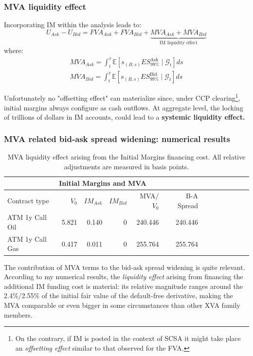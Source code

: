 \documentclass{beamer}
\begin{document}
\begin{frame}
\frametitle{MVA liquidity effect}
\footnotesize{
	Incorporating IM within the analysis leads to:
	\begin{equation}\label{bid-ask2}
		U_{Ask}-U_{Bid} = FVA_{Ask} + FVA_{Bid} + \underbrace{MVA_{Ask} + MVA_{Bid}}_{\text{IM liquidity effect}}
	\end{equation}
	where:
	\begin{equation}
	\begin{split}
		MVA_{Ask} = \int_{t}^{\bar{\tau} }  \mathbb{E} \left[   s_{(B,s)} 	ES_{99\%}^{\text{Ask}} \mid \mathcal{G}_{t} \right] ds \\
		MVA_{Bid} = \int_{t}^{\bar{\tau} }  \mathbb{E} \left[   s_{(B,s)} ES_{99\%}^{\text{Bid}} \mid \mathcal{G}_{t} \right] ds
	\end{split}
	\end{equation}

	Unfortunately no "offsetting effect" can materialize since, under CCP clearing\footnote{On the contrary, if IM is posted in the context of SCSA it might take place an \textit{offsetting effect} similar to that observed for the FVA.}, initial margins always configure as cash outflows. At aggregate level, the locking of trillions of dollars in IM accounts, could lead to a \textbf{systemic liquidity effect.}
}
\end{frame}

\begin{frame}
\frametitle{MVA related bid-ask spread widening: numerical results}
	\begin{table} [htbp]
	\centering
	\begin{tabular}{ |p{3.0 cm}| r|r|r|r|r|r|p{1.5cm}|r| p{1.5cm}| p{1.5cm}| 
			p{1.5cm}| p{1.5cm}| } 	
		\hline
		\multicolumn{6}{|c|}{\textbf{Initial Margins and MVA }} \\
		\hline
		Contract type & $V_{0}$  &$IM_{Ask}$ & $IM_{Bid}$ &MVA/${V}_0$ & B-A Spread\\
		\hline
		ATM 1y Call Oil &5.821 &0.140  & 0  &240.446  &240.446 \\
		ATM 1y Call Gas &0.417 &0.011 &0  &255.764  & 255.764  \\		
		\hline
	\end{tabular}
	\caption{MVA liquidity effect arising from the Initial Margins financing cost. All relative adjustments are measured in basis points.}
	\end{table}
	The contribution of MVA terms to the bid-ask spread widening is quite relevant. According to my numerical results, the \textit{liquidity effect} arising from financing the additional IM funding cost is material: its relative magnitude ranges around the 2.4\%/2.55\% of the initial fair value of the default-free derivative, making the MVA comparable or even bigger in some circumstances than other XVA family members.
\end{frame}
\end{document}
